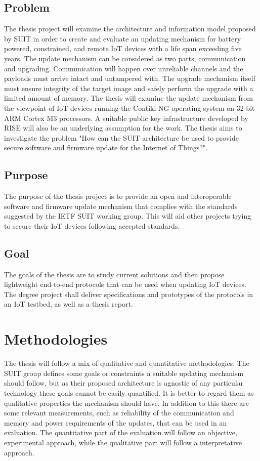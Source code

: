\documentclass[0-thesis.tex]{subfiles}
\begin{document}
\subsection{Problem}
The thesis project will examine the architecture and information model proposed by SUIT in
order to create and evaluate an updating mechanism for battery powered, constrained, and
remote IoT devices with a life span exceeding five years. The update mechanism can be
considered as two parts, communication and upgrading. Communication will happen over
unreliable channels and the payloads must arrive intact and untampered with. The upgrade
mechanism itself must ensure integrity of the target image and safely perform the upgrade
with a limited amount of memory. The thesis will examine the update mechanism from the
viewpoint of IoT devices running the Contiki-NG operating system on 32-bit ARM Cortex M3
processors. A suitable public key infrastructure developed by RISE will also be an
underlying assumption for the work. The thesis aims to investigate the problem "How can
the SUIT architecture be used to provide secure software and firmware update for the
Internet of Things?".

\subsection{Purpose}
The purpose of the thesis project is to provide an open and interoperable software and
firmware update mechanism that complies with the standards suggested by the IETF SUIT
working group. This will aid other projects trying to secure their IoT devices following
accepted standards.

\subsection{Goal}
The goals of the thesis are to study current solutions and then propose lightweight
end-to-end protocols that can be used when updating IoT devices. The degree project shall
deliver specifications and prototypes of the protocols in an IoT testbed, as well as a
thesis report.

\section{Methodologies}
The thesis will follow a mix of qualitative and quantitative methodologies. The SUIT group
defines some goals or constraints a suitable updating mechanism should follow, but as
their proposed architecture is agnostic of any particular technology these goals cannot be
easily quantified. It is better to regard them as qualitative properties the mechanism
should have. In addition to this there are some relevant measurements, such as reliability
of the communication and memory and power requirements of the updates, that can be used in
an evaluation. The quantitative part of the evaluation will follow an objective,
experimental approach, while the qualitative part will follow a interpretative approach.
\end{document}
